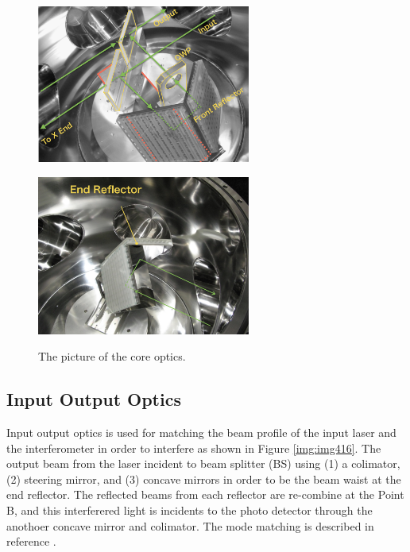 \begin{figure}[p]
  \begin{minipage}[b]{0.5\hsize}
    \begin{center}   
      \includegraphics[width=7cm]{./img_chap4/img418.png} %
      \label{img:img418}
    \end{center}
  \end{minipage}\hspace{0.1cm}
  \begin{minipage}[b]{0.5\hsize}
    \begin{center}   
      \includegraphics[width=7cm]{./img_chap4/img419.png} %
      \label{img:img419}
    \end{center}
  \end{minipage}
  \caption{The picture of the core optics.}  
\end{figure}


\subsection{Input Output Optics}
Input output optics is used for matching the beam profile of the input laser and the interferometer in order to interfere as shown in Figure  \ref{img:img416}. The output beam from the laser incident to beam splitter (BS) using (1) a colimator, (2) steering mirror, and (3) concave mirrors in order to be the beam waist at the end reflector. The reflected beams from each reflector are re-combine at the Point B, and this interferered light is incidents to the photo detector through the anothoer concave mirror and colimator. The mode matching is described in reference \cite{miyo2017baseline}.


